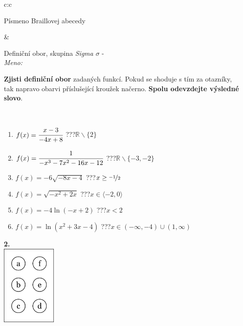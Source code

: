 \documentclass[10pt]{report}
\begin{document}
\begin{tabular}{c:c}
\begin{minipage}[c][104.5mm][t]{0.5\linewidth}
\begin{center}
\begin{minipage}{0.20\linewidth}
\begin{center}
{\small Písmeno Braillovej abecedy}
\end{center}
\end{minipage}
\end{center}
\end{minipage}
&
\begin{minipage}[c][104.5mm][t]{0.5\linewidth}
\begin{center}
\vspace{7mm}
{\huge Definiční obor, skupina \textit{Sigma $\sigma$} -}\\[5mm]
\textit{Meno:}\phantom{xxxxxxxxxxxxxxxxxxxxxxxxxxxxxxxxxxxxxxxxxxxxxxxxxxxxxxxxxxxxxxxxx}\\[5mm]
\begin{minipage}{0.95\linewidth}
\textbf{Zjisti definiční obor} zadaných funkcí. Pokud se shoduje s tím za otazníky,\\tak napravo obarvi příslušející kroužek načerno. \textbf{Spolu odevzdejte výsledné slovo}.
\end{minipage}
\\[1mm]
\begin{minipage}{0.79\linewidth}
\begin{center}
\begin{varwidth}{\linewidth}
\begin{enumerate}
\normalsizerrr
\item $f(x)=\cfrac{x-3}{-4x+8}$\quad \dotfill\; ???\;\dotfill \quad $\mathbb{R}\smallsetminus\{2\}$
\item $f(x)=\cfrac{1}{-x^3-7x^2-16x-12}$\quad \dotfill\; ???\;\dotfill \quad $\mathbb{R}\smallsetminus\{-3,-2\}$
\item $f(x)=-6\sqrt{-8x-4}$\quad \dotfill\; ???\;\dotfill \quad $x\geq\nicefrac{-1}{2}$
\item $f(x)=\sqrt{-x^2+2x}$\quad \dotfill\; ???\;\dotfill \quad $x\in\langle-2 , 0\rangle$
\item $f(x)=-4\ln{(-x+2)}$\quad \dotfill\; ???\;\dotfill \quad $x<2$
\item $f(x)=\ln{(x^2+3x-4)}$\quad \dotfill\; ???\;\dotfill \quad $x\in(-\infty , -4)\cup(1 , \infty)$
\end{enumerate}
\end{varwidth}
\end{center}
\end{minipage}
\begin{minipage}{0.20\linewidth}
\begin{center}
{\Huge\bfseries 2.} \\[2mm]
\includegraphics[height=40mm]{../images/braille.png}

\end{center}
\end{minipage}
\end{center}
\end{minipage}
\end{tabular}
\end{document}
